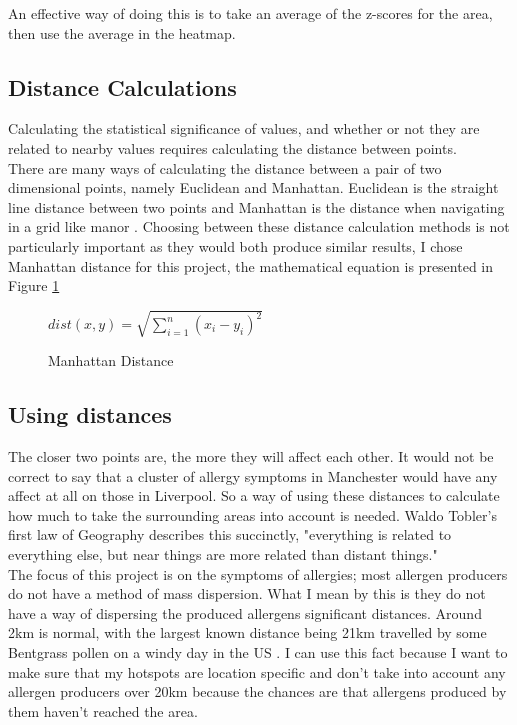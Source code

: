 An effective way of doing this is to take an average of the z-scores for the area, then use the average in the heatmap.

\subsection{Distance Calculations}

Calculating the statistical significance of values, and whether or not they are related to nearby values requires calculating the distance between points.\\

There are many ways of calculating the distance between a pair of two dimensional points, namely Euclidean and Manhattan. Euclidean is the straight line distance between two points and Manhattan is the distance when navigating in a grid like manor \cite{manhatc}. Choosing between these distance calculation methods is not particularly important as they would both produce similar results, I chose Manhattan distance for this project, the mathematical equation is presented in Figure \ref{dia:manhat}

\begin{figure}[h]
\begin{center}
$dist (x, y)  = \sqrt{\sum_{i=1}^n (x_i - y_i)^2 }$
\caption{Manhattan Distance}
\label{dia:manhat}
\end{center}
\end{figure}

\subsection{Using distances}

The closer two points are, the more they will affect each other. It would not be correct to say that a cluster of allergy symptoms in Manchester would have any affect at all on those in Liverpool. So a way of using these distances to calculate how much to take the surrounding areas into account is needed. Waldo Tobler's first law of Geography describes this succinctly, "everything is related to everything else, but near things are more related than distant things." \cite{waldo}\\

The focus of this project is on the symptoms  of allergies; most allergen producers do not have a method of mass dispersion. What I mean by this is they do not have a way of dispersing the produced allergens significant distances. Around 2km is normal, with the largest known distance being 21km travelled by some Bentgrass pollen on a windy day in the US \cite{pollenwr}. I can use this fact because I want to make sure that my hotspots are location specific and don't take into account any allergen producers over 20km because the chances are that allergens produced by them haven't reached the area.\\


